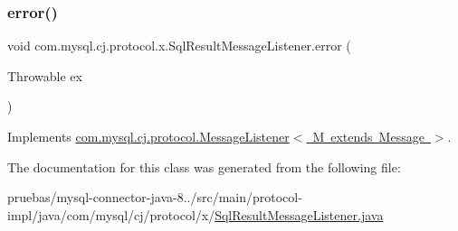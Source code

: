 \subsubsection{\texorpdfstring{error()}{error()}}
{\footnotesize\ttfamily void com.\+mysql.\+cj.\+protocol.\+x.\+Sql\+Result\+Message\+Listener.\+error (\begin{DoxyParamCaption}\item[{Throwable}]{ex }\end{DoxyParamCaption})}



Implements \mbox{\hyperlink{interfacecom_1_1mysql_1_1cj_1_1protocol_1_1_message_listener_a9e06f02beaf29eb065149ac4f819761f}{com.\+mysql.\+cj.\+protocol.\+Message\+Listener$<$ M extends Message $>$}}.



The documentation for this class was generated from the following file\+:\begin{DoxyCompactItemize}
\item 
pruebas/mysql-\/connector-\/java-\/8../src/main/protocol-\/impl/java/com/mysql/cj/protocol/x/\mbox{\hyperlink{_sql_result_message_listener_8java}{Sql\+Result\+Message\+Listener.\+java}}\end{DoxyCompactItemize}
